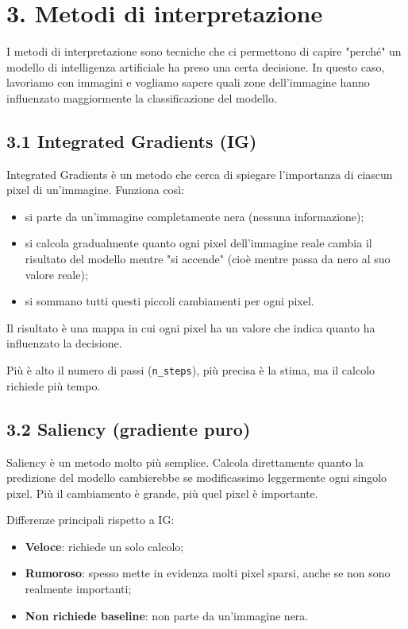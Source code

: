 \documentclass[a4paper,11pt]{article}
\begin{document}
\section*{3. Metodi di interpretazione}
I metodi di interpretazione sono tecniche che ci permettono di capire "perché" un modello di intelligenza artificiale ha preso una certa decisione. In questo caso, lavoriamo con immagini e vogliamo sapere quali zone dell'immagine hanno influenzato maggiormente la classificazione del modello.

\subsection*{3.1 Integrated Gradients (IG)}
Integrated Gradients è un metodo che cerca di spiegare l'importanza di ciascun pixel di un'immagine. Funziona così:
\begin{itemize}
\item si parte da un'immagine completamente nera (nessuna informazione);
\item si calcola gradualmente quanto ogni pixel dell'immagine reale cambia il risultato del modello mentre "si accende" (cioè mentre passa da nero al suo valore reale);
\item si sommano tutti questi piccoli cambiamenti per ogni pixel.
\end{itemize}
Il risultato è una mappa in cui ogni pixel ha un valore che indica quanto ha influenzato la decisione.

Più è alto il numero di passi (\texttt{n\_steps}), più precisa è la stima, ma il calcolo richiede più tempo.

\subsection*{3.2 Saliency (gradiente puro)}
Saliency è un metodo molto più semplice. Calcola direttamente quanto la predizione del modello cambierebbe se modificassimo leggermente ogni singolo pixel. Più il cambiamento è grande, più quel pixel è importante.

Differenze principali rispetto a IG:
\begin{itemize}
\item \textbf{Veloce}: richiede un solo calcolo;
\item \textbf{Rumoroso}: spesso mette in evidenza molti pixel sparsi, anche se non sono realmente importanti;
\item \textbf{Non richiede baseline}: non parte da un'immagine nera.
\end{itemize}
\end{document}
